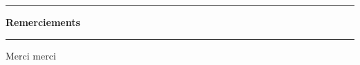 \EmptyNewPage
\DontFrameThisInToc
 \hrule
  \vspace{15pt}%
  {\Huge {}\selectfont \textbf{Remerciements}}
   \par\nobreak
    \vspace{15pt}
       \hrule
   \vskip20pt
	\normalsize
	
Merci merci

\EmptyNewPage